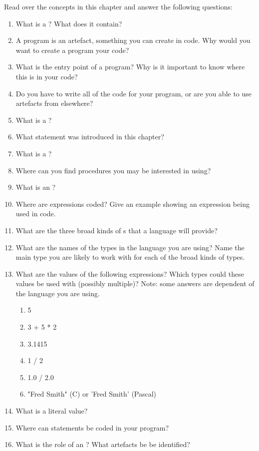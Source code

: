 Read over the concepts in this chapter and answer the following questions:
\begin{enumerate}
  \item What is a ? What does it contain?
  \item A program is an artefact, something you can create in code. Why would you want to create a program your code?
  \item What is the entry point of a program? Why is it important to know where this is in your code?
  \item Do you have to write all of the code for your program, or are you able to use artefacts from elsewhere?
  \item What is a ?
  \item What statement was introduced in this chapter?
  \item What is a ?
  \item Where can you find procedures you may be interested in using?
  \item What is an ?
  \item Where are expressions coded? Give an example showing an expression being used in code.
  \item What are the three broad kinds of s that a language will provide?
  \item What are the names of the types in the language you are using? Name the main type you are likely to work with for each of the broad kinds of types.
  \item What are the values of the following expressions? Which types could these values be used with (possibly multiple)? Note: some answers are dependent of the language you are using.
  \begin{enumerate}
    \item 5
    \item 3 + 5 * 2
    \item 3.1415
    \item 1 / 2 
    \item 1.0 / 2.0
    \item "Fred Smith" (C) or 'Fred Smith' (Pascal)
  \end{enumerate} 
  \item What is a literal value?
  \item Where can statements be coded in your program?
  \item What is the role of an ? What artefacts be be identified?

\end{enumerate}
